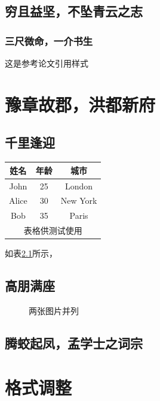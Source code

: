 \documentclass{QHUthesis}
\begin{document}
\section{穷且益坚，不坠青云之志}
\subsection{三尺微命，一介书生}
这是参考论文引用样式\cite{kocher99,cnproceed}

\zhlipsum[1-3]
\chapter{豫章故郡，洪都新府}
\section{千里逢迎}
\zhlipsum[1-3]

\begin{table}
	\centering
	\begin{tabular}{|c|c|c|}
		\hline
		\textbf{姓名} & \textbf{年龄} & \textbf{城市} \\
		\hline
		John & 25 & London \\
		\hline
		Alice & 30 & New York \\
		\hline
		Bob & 35 & Paris \\
		\hline
		\multicolumn{3}{|c|}{表格供测试使用} \\ 
		\hline
	\end{tabular}
	\label{tab:1}
\end{table}

如表\ref{tab:1}所示，\zhlipsum[1]


\section{高朋满座}

\begin{figure}[htbp]
	\centering
	\caption{两张图片并列}
	\label{fig:subfigure_example1}
\end{figure}

\zhlipsum[1-5]
\section{腾蛟起凤，孟学士之词宗}
\chapter{格式调整}
\zhlipsum[1]
\end{document}
